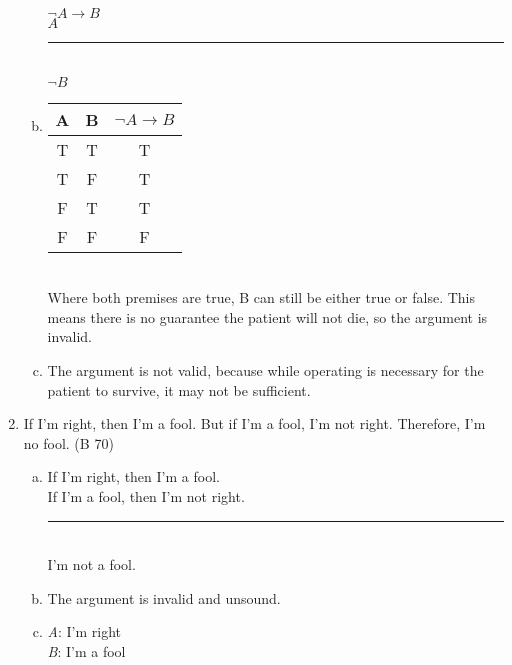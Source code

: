 \documentclass{article}
\begin{document}
\begin{enumerate}
\begin{enumerate}[(a)]
                        $\neg A \to B$\\
                        $A$\\
                        \rule{5em}{.5pt}\\
                        $\neg B$
                  \item
                        \begin{tabular}{c|c|c}
                              A                      & B & $\neg A \to B$ \\
                              \hline
                              T                      & T & T              \\
                              T                      & F & T              \\
                              \rowcolor{lightgray} F & T & T              \\
                              \rowcolor{lightgray} F & F & F
                        \end{tabular} \\
                        Where both premises are true, B can still be either true or false. This means there is no guarantee the patient will not die, so the argument is invalid.
                  \item The argument is not valid, because while operating is necessary for the patient to survive, it may not be sufficient.
            \end{enumerate}
      \item If I'm right, then I'm a fool. But if I'm a fool, I'm not right. Therefore, I'm no fool. (B 70)
            \begin{enumerate}[(a)]
                  \item If I'm right, then I'm a fool.\\
                        If I'm a fool, then I'm not right.\\
                        \rule{15em}{.5pt}\\
                        I'm not a fool.
                  \item The argument is invalid and unsound.
                  \item \textit{A}: I'm right\\
                        \textit{B}: I'm a fool\\


\end{enumerate}
\end{enumerate}
\end{document}
